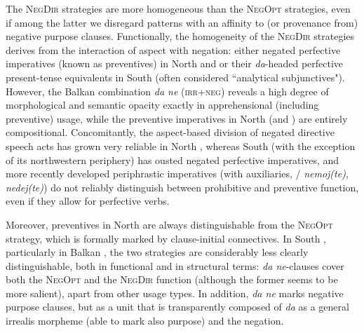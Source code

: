 \documentclass[output=paper,colorlinks,citecolor=brown]{langscibook}
\begin{document}
The \textsc{NegDir} strategies are more homogeneous than the \textsc{NegOpt} strategies, even if among the latter we disregard patterns with an affinity to (or provenance from) negative purpose clauses. Functionally, the homogeneity of the \textsc{NegDir} strategies derives from the interaction of aspect with negation: either negated perfective imperatives (known as preventives) in North  and  or their \textit{da}-headed perfective present-tense equivalents in South  (often considered ``analytical subjunctives"). However, the Balkan  combination \textit{da ne} (\textsc{irr+neg}) reveals a high degree of morphological and semantic opacity exactly in apprehensional (including preventive) usage, while the preventive imperatives in North  (and ) are entirely compositional. Concomitantly, the aspect-based division of negated directive speech acts has grown very reliable in North , whereas South  (with the exception of its northwestern periphery) has ousted negated perfective imperatives, and more recently developed periphrastic imperatives (with auxiliaries, / \textit{nemoj(te)},  \textit{nedej(te)}) do not reliably distinguish between prohibitive and preventive function, even if they allow for perfective verbs.

Moreover, preventives in North  are always distinguishable from the \textsc{Neg}\textsc{Opt} strategy, which is formally marked by clause-initial connectives. In South , particularly in Balkan , the two strategies are considerably less clearly distinguishable, both in functional and in structural terms: \textit{da ne}-clauses cover both the \textsc{NegOpt} and the \textsc{NegDir} function (although the former seems to be more salient), apart from other usage types. In addition, \textit{da ne} marks negative purpose clauses, but as a unit that is transparently composed of \textit{da} as a general irrealis morpheme (able to mark also purpose) and the negation.
\end{document}
